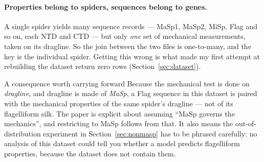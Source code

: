 \paragraph{Properties belong to spiders, sequences belong to genes.}
A single spider yields many sequence records --- MaSp1, MaSp2, MiSp, Flag and so
on, each NTD and CTD --- but only \emph{one} set of mechanical measurements,
taken on its dragline. So the join between the two files is one-to-many, and
the key is the individual spider. Getting this wrong is what made my first
attempt at rebuilding the dataset return zero rows
(Section~\ref{sec:dataset}).

\begin{warnbox}{A consequence worth carrying forward}
Because the mechanical test is done on \emph{dragline}, and dragline is made of
\emph{MaSp}, a Flag sequence in this dataset is paired with the mechanical
properties of the same spider's dragline --- not of its flagelliform silk. The
paper is explicit about assuming ``MaSp governs the mechanics'', and restricting
to MaSp follows from that. It also means the out-of-distribution experiment in
Section~\ref{sec:nonmasp} has to be phrased carefully: no analysis of this
dataset could tell you whether a model predicts flagelliform properties,
because the dataset does not contain them.
\end{warnbox}
